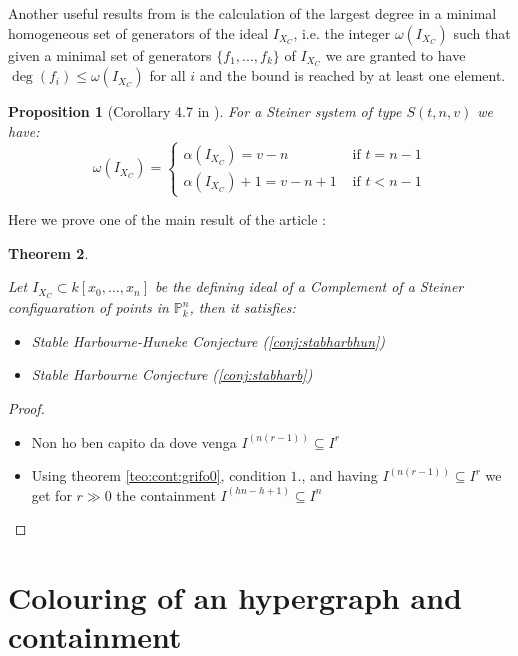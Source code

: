 \documentclass[]{book}
\theoremstyle{plain}
\newtheorem{teo}{Theorem}[section]
\newtheorem{prop}[teo]{Proposition}
\theoremstyle{remark}
\theoremstyle{definition}
\newcommand{\PP}{\mathbb{P}}
\newcommand{\cont}[2]{ I^{(#1)} \subseteq I^{#2}}
\begin{document}
Another useful results from \cite{Bal20Steiner} is the calculation of the largest degree in a minimal homogeneous set of generators of the ideal $ I_{X_C} $, i.e. the integer $ \omega (I_{X_	C}) $ such that given a minimal set of generators $\{ f_1 ,... , f_k\} $ of $ I_{X_	C} $ we are granted to have $ \deg (f_i) \leq \omega (I_{X_	C}) $ for all $ i $ and the bound is reached by at least one element. %

\begin{prop}[Corollary 4.7 in \cite{Bal20Steiner}]
\label{prop:largdeg}
For a Steiner system of type $ S(t,n,v) $ we have:
\begin{equation}\label{eq:largdeg}
\omega (I_{X_	C}) = 
\begin{cases}
\alpha (I_{X_	C})=v-n     & \text{ if } t = n-1\\
\alpha (I_{X_	C})+1=v-n +1 & \text{ if } t < n-1
\end{cases}
\end{equation}
\end{prop}

Here we prove one of the main result of the article \cite{Bal21Steiner}:
\begin{teo}\label{teo:cont:csteiner}

Let $ I_{X_C} \subset k[x_0 , ... , x_n]$ be the defining ideal of a Complement of a Steiner configuaration of points in $ \PP^n_k $, then it satisfies:
\begin{itemize}
\item Stable Harbourne-Huneke Conjecture (\ref{conj:stabharbhun})
\item Stable Harbourne Conjecture (\ref{conj:stabharb})
\end{itemize}
\end{teo}

\begin{proof}
\begin{itemize}
\item \begin{tcolorbox}
Non ho ben capito da dove venga $ \cont{n(r-1)}{r} $
\end{tcolorbox}
\item Using theorem \ref{teo:cont:grifo0}, condition $ 1. $, and having $ \cont{n(r-1)}{r} $ we get for $ r \gg 0 $ the containment $ \cont{hn - h +1}{n} $
\end{itemize}
\end{proof}


 

\chapter{Colouring of an hypergraph and containment}
\end{document}
